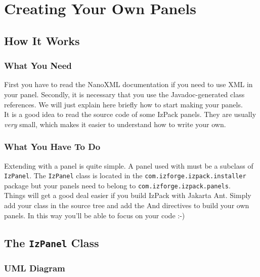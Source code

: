 \chapter{Creating Your Own Panels}

\section{How It Works}

\subsection{What You Need}

First you have to read the NanoXML documentation if you need to use XML
in your panel. Secondly, it is necessary that you use the
Javadoc-generated class references. We will just explain here briefly
how to start making your panels.\\

It is a good idea to read the source code of some IzPack panels. They
are usually \textsl{very} small, which makes it easier to understand how
to write your own.\\

\subsection{What You Have To Do}

Extending \IzPack with a panel is quite simple. A panel used with
\IzPack must be a subclass of \texttt{IzPanel}. The \texttt{IzPanel}
class is located in the \texttt{com.izforge.izpack.installer} package
but your panels need to belong to \texttt{com.izforge.izpack.panels}.\\

Things will get a good deal easier if you build IzPack with Jakarta Ant.
Simply add your class in the source tree and add the And directives to
build your own panels. In this way you'll be able to focus on your code
:-)\\

\section{The \texttt{IzPanel} Class}

\subsection{UML Diagram}

